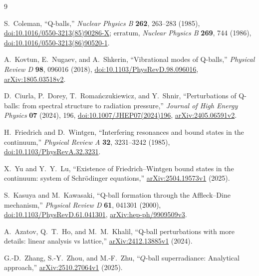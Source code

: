 \begin{thebibliography}{9}

S.~Coleman,
``Q-balls,''
\emph{Nuclear Physics B} \textbf{262}, 263--283 (1985),
\href{https://doi.org/10.1016/0550-3213(85)90286-X}{doi:10.1016/0550-3213(85)90286-X};
erratum, \emph{Nuclear Physics B} \textbf{269}, 744 (1986),
\href{https://doi.org/10.1016/0550-3213(86)90520-1}{doi:10.1016/0550-3213(86)90520-1}.

A.~Kovtun, E.~Nugaev, and A.~Shkerin,
``Vibrational modes of Q-balls,''
\emph{Physical Review D} \textbf{98}, 096016 (2018),
\href{https://doi.org/10.1103/PhysRevD.98.096016}{doi:10.1103/PhysRevD.98.096016},
\href{https://arxiv.org/abs/1805.03518v2}{arXiv:1805.03518v2}.

D.~Ciurla, P.~Dorey, T.~Roma\'nczukiewicz, and Y.~Shnir,
``Perturbations of Q-balls: from spectral structure to radiation pressure,''
\emph{Journal of High Energy Physics} \textbf{07} (2024), 196,
\href{https://doi.org/10.1007/JHEP07(2024)196}{doi:10.1007/JHEP07(2024)196},
\href{https://arxiv.org/abs/2405.06591v2}{arXiv:2405.06591v2}.

H.~Friedrich and D.~Wintgen,
``Interfering resonances and bound states in the continuum,''
\emph{Physical Review A} \textbf{32}, 3231--3242 (1985),
\href{https://doi.org/10.1103/PhysRevA.32.3231}{doi:10.1103/PhysRevA.32.3231}.

X.~Yu and Y.~Y.~Lu,
``Existence of Friedrich--Wintgen bound states in the continuum: system of Schr\"odinger equations,''
\href{https://arxiv.org/abs/2504.19573v1}{arXiv:2504.19573v1} (2025).

S.~Kasuya and M.~Kawasaki,
``Q-ball formation through the Affleck--Dine mechanism,''
\emph{Physical Review D} \textbf{61}, 041301 (2000),
\href{https://doi.org/10.1103/PhysRevD.61.041301}{doi:10.1103/PhysRevD.61.041301},
\href{https://arxiv.org/abs/hep-ph/9909509v3}{arXiv:hep-ph/9909509v3}.

A.~Azatov, Q.~T.~Ho, and M.~M.~Khalil,
``Q-ball perturbations with more details: linear analysis vs lattice,''
\href{https://arxiv.org/abs/2412.13885v1}{arXiv:2412.13885v1} (2024).

G.-D.~Zhang, S.-Y.~Zhou, and M.-F.~Zhu,
``$Q$-ball superradiance: Analytical approach,''
\href{https://arxiv.org/abs/2510.27064v1}{arXiv:2510.27064v1} (2025).


\end{thebibliography}
